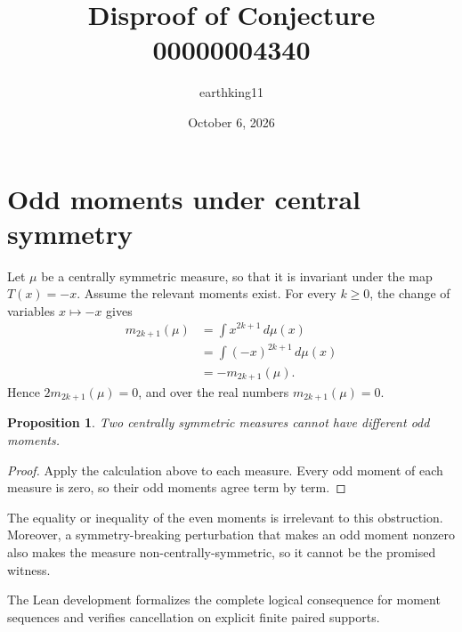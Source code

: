 \documentclass[11pt]{article}
\title{Disproof of Conjecture 00000004340}
\author{earthking11}
\date{October 6, 2026}
\newtheorem{proposition}{Proposition}
\begin{document}
\maketitle
\section*{Odd moments under central symmetry}
Let $\mu$ be a centrally symmetric measure, so that it is invariant under the
map $T(x)=-x$.  Assume the relevant moments exist.  For every $k\ge0$, the
change of variables $x\mapsto-x$ gives
\begin{align*}
 m_{2k+1}(\mu)
 &=\int x^{2k+1}\,d\mu(x)\\
 &=\int (-x)^{2k+1}\,d\mu(x)\\
 &=-m_{2k+1}(\mu).
\end{align*}
Hence $2m_{2k+1}(\mu)=0$, and over the real numbers
$m_{2k+1}(\mu)=0$.

\begin{proposition}
Two centrally symmetric measures cannot have different odd moments.
\end{proposition}
\begin{proof}
Apply the calculation above to each measure.  Every odd moment of each measure
is zero, so their odd moments agree term by term.
\end{proof}

The equality or inequality of the even moments is irrelevant to this
obstruction.  Moreover, a symmetry-breaking perturbation that makes an odd
moment nonzero also makes the measure non-centrally-symmetric, so it cannot be
the promised witness.

The Lean development formalizes the complete logical consequence for moment
sequences and verifies cancellation on explicit finite paired supports.
\end{document}
